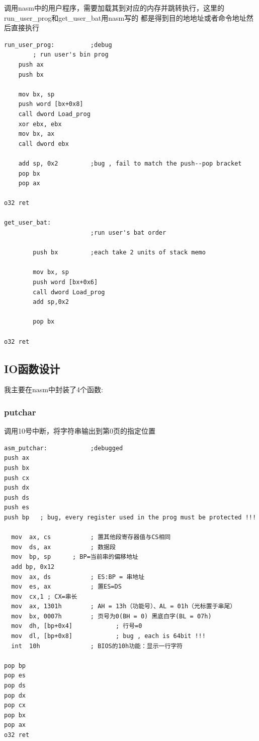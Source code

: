 \documentclass[a4paper,11pt,UTF8]{ctexart}
\begin{document}
  调用nasm中的用户程序，需要加载其到对应的内存并跳转执行，这里的run\_user\_prog和get\_user\_bat用nasm写的
  都是得到目的地地址或者命令地址然后直接执行
      \begin{lstlisting}[caption={获取首地址之后，直接跳转执行},tabsize=4,basicstyle=\footnotesize,captionpos=b]
run_user_prog:			;debug
        ; run user's bin prog
    push ax
    push bx

    mov bx, sp
    push word [bx+0x8]
    call dword Load_prog	
    xor ebx, ebx
    mov bx, ax
    call dword ebx

    add sp, 0x2  		;bug , fail to match the push--pop bracket 
    pop bx
    pop ax

o32 ret   

get_user_bat:
						;run user's bat order

		push bx			;each take 2 units of stack memo

		mov bx, sp
		push word [bx+0x6]
		call dword Load_prog
		add sp,0x2

		pop bx

o32	ret

      \end{lstlisting}
       
      \subsection{IO函数设计}
      我主要在nasm中封装了4个函数:
        \subsubsection{putchar}
        调用10号中断，将字符串输出到第0页的指定位置
        \begin{lstlisting}[caption={putchar },tabsize=4,basicstyle=\footnotesize,captionpos=b]
asm_putchar:			;debugged
push ax
push bx
push cx
push dx
push ds
push es
push bp   ; bug, every register used in the prog must be protected !!!

  mov  ax, cs           ; 置其他段寄存器值与CS相同
  mov  ds, ax           ; 数据段
  mov  bp, sp      ; BP=当前串的偏移地址
  add bp, 0x12
  mov  ax, ds           ; ES:BP = 串地址
  mov  es, ax           ; 置ES=DS
  mov  cx,1 ; CX=串长
  mov  ax, 1301h        ; AH = 13h（功能号）、AL = 01h（光标置于串尾）
  mov  bx, 0007h        ; 页号为0(BH = 0) 黑底白字(BL = 07h)
  mov  dh, [bp+0x4]            ; 行号=0
  mov  dl, [bp+0x8]            ; bug , each is 64bit !!!
  int  10h              ; BIOS的10h功能：显示一行字符

pop bp
pop es
pop ds
pop dx
pop cx
pop bx
pop ax
o32	ret          
        \end{lstlisting}              
\end{document}
